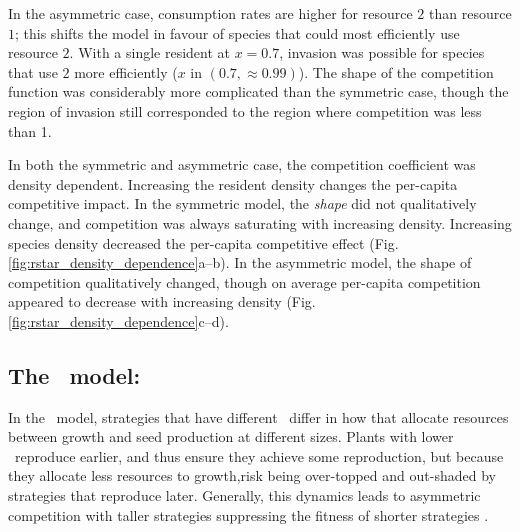 \documentclass[a4paper,11pt]{article}
\newcommand{\verify}[1]{{\color{navy}{(verify: #1)}}}
\newcommand{\todo}[1]{{\color{navy}{(todo: #1)}}}
\begin{document}
In the asymmetric case, consumption rates are higher for resource $2$ than resource $1$; this shifts the model in favour of species that could most efficiently use resource $2$. With a single resident at $x = 0.7$, invasion was possible for species that use $2$ more efficiently ($x$ in $(0.7, \approx 0.99)$). The shape of the competition function was considerably more complicated than the symmetric case, though the region of invasion still corresponded to the region where competition was less than 1.

\todo{DF can't recall how to interpret these figures. Not a good sign. Revisit methods to ensure we understand how this is being calculated and that it aligns with the methods as described. }
In both the symmetric and asymmetric case, the competition coefficient was density dependent. \verify{what do we mean by this? shape of the competition function varied considerably with the density of the resident? Below we say it doesn't change. } Increasing the resident density changes the per-capita competitive impact. In the symmetric model, the \emph{shape} did not qualitatively change, and competition was always saturating with increasing density. Increasing species density decreased the per-capita competitive effect (Fig. \ref{fig:rstar_density_dependence}a--b). In the asymmetric model, the shape of competition qualitatively changed, though on average per-capita competition appeared to decrease with increasing density (Fig. \ref{fig:rstar_density_dependence}c--d). 

\subsection{The \plant\ model: \hmat}

In the \plant\ model, strategies that have different \hmat\ differ in how that allocate resources between growth and seed production at different sizes. Plants with lower \hmat\ reproduce earlier, and thus ensure they achieve some reproduction, but because they allocate less resources to growth,risk being over-topped and out-shaded by strategies that reproduce later. Generally, this dynamics leads to asymmetric competition with taller strategies suppressing the fitness of shorter strategies \cite{Falster-2017}.
\end{document}
